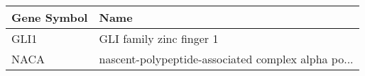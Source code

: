 \begin{tabular}{ll}
\toprule
Gene Symbol &                                               Name \\
\midrule
       GLI1 &                           GLI family zinc finger 1 \\
       NACA & nascent-polypeptide-associated complex alpha po... \\
\bottomrule
\end{tabular}
